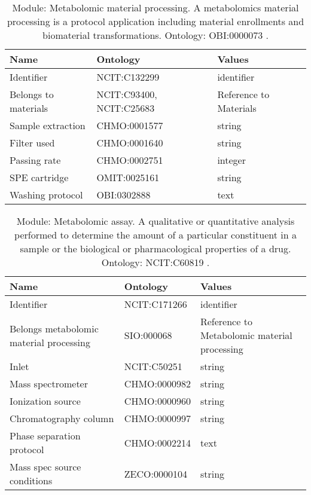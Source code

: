 \documentclass{article}
\begin{document}
\begin{table}[htb]
\begin{tabular}{lll}
Name & Ontology & Values \\
\hline
Identifier & NCIT:C132299  & identifier \\
Belongs to materials & NCIT:C93400, NCIT:C25683  & Reference to Materials \\
Sample extraction & CHMO:0001577  & string \\
Filter used & CHMO:0001640  & string \\
Passing rate & CHMO:0002751  & integer \\
SPE cartridge & OMIT:0025161  & string \\
Washing protocol & OBI:0302888  & text \\
\hline
\end{tabular}
\caption[Module: Metabolomic material processing]{\label{table:table16} Module: Metabolomic material processing. A metabolomics material processing is a protocol application including material enrollments and biomaterial transformations. Ontology: OBI:0000073 . }
\end{table}

\begin{table}[htb]
\begin{tabular}{lll}
Name & Ontology & Values \\
\hline
Identifier & NCIT:C171266  & identifier \\
Belongs metabolomic material processing & SIO:000068  & Reference to Metabolomic material processing \\
Inlet & NCIT:C50251  & string \\
Mass spectrometer & CHMO:0000982  & string \\
Ionization source & CHMO:0000960  & string \\
Chromatography column & CHMO:0000997  & string \\
Phase separation protocol & CHMO:0002214  & text \\
Mass spec source conditions & ZECO:0000104  & string \\
\hline
\end{tabular}
\caption[Module: Metabolomic assay]{\label{table:table17} Module: Metabolomic assay. A qualitative or quantitative analysis performed to determine the amount of a particular constituent in a sample or the biological or pharmacological properties of a drug. Ontology: NCIT:C60819 . }
\end{table}
\end{document}
